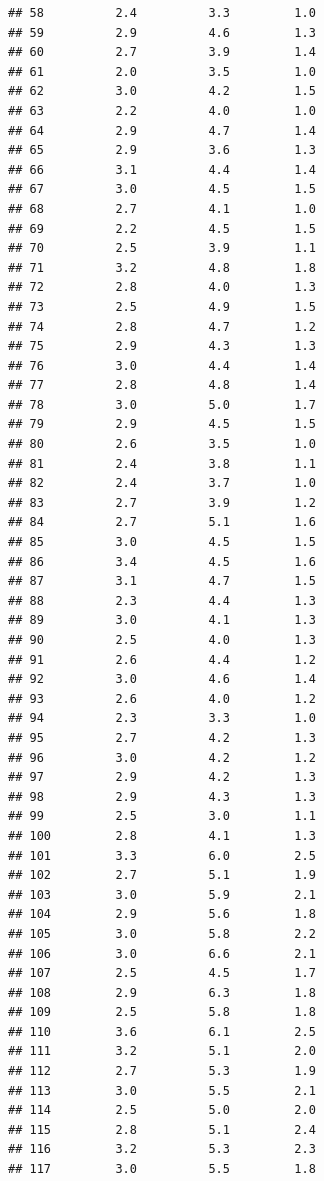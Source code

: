 \documentclass[
]{book}
\theoremstyle{definition}
\theoremstyle{definition}
\theoremstyle{definition}
\theoremstyle{definition}
\theoremstyle{remark}
\begin{document}
\begin{verbatim}
## 58          2.4          3.3         1.0
## 59          2.9          4.6         1.3
## 60          2.7          3.9         1.4
## 61          2.0          3.5         1.0
## 62          3.0          4.2         1.5
## 63          2.2          4.0         1.0
## 64          2.9          4.7         1.4
## 65          2.9          3.6         1.3
## 66          3.1          4.4         1.4
## 67          3.0          4.5         1.5
## 68          2.7          4.1         1.0
## 69          2.2          4.5         1.5
## 70          2.5          3.9         1.1
## 71          3.2          4.8         1.8
## 72          2.8          4.0         1.3
## 73          2.5          4.9         1.5
## 74          2.8          4.7         1.2
## 75          2.9          4.3         1.3
## 76          3.0          4.4         1.4
## 77          2.8          4.8         1.4
## 78          3.0          5.0         1.7
## 79          2.9          4.5         1.5
## 80          2.6          3.5         1.0
## 81          2.4          3.8         1.1
## 82          2.4          3.7         1.0
## 83          2.7          3.9         1.2
## 84          2.7          5.1         1.6
## 85          3.0          4.5         1.5
## 86          3.4          4.5         1.6
## 87          3.1          4.7         1.5
## 88          2.3          4.4         1.3
## 89          3.0          4.1         1.3
## 90          2.5          4.0         1.3
## 91          2.6          4.4         1.2
## 92          3.0          4.6         1.4
## 93          2.6          4.0         1.2
## 94          2.3          3.3         1.0
## 95          2.7          4.2         1.3
## 96          3.0          4.2         1.2
## 97          2.9          4.2         1.3
## 98          2.9          4.3         1.3
## 99          2.5          3.0         1.1
## 100         2.8          4.1         1.3
## 101         3.3          6.0         2.5
## 102         2.7          5.1         1.9
## 103         3.0          5.9         2.1
## 104         2.9          5.6         1.8
## 105         3.0          5.8         2.2
## 106         3.0          6.6         2.1
## 107         2.5          4.5         1.7
## 108         2.9          6.3         1.8
## 109         2.5          5.8         1.8
## 110         3.6          6.1         2.5
## 111         3.2          5.1         2.0
## 112         2.7          5.3         1.9
## 113         3.0          5.5         2.1
## 114         2.5          5.0         2.0
## 115         2.8          5.1         2.4
## 116         3.2          5.3         2.3
## 117         3.0          5.5         1.8

\end{verbatim}
\end{document}
